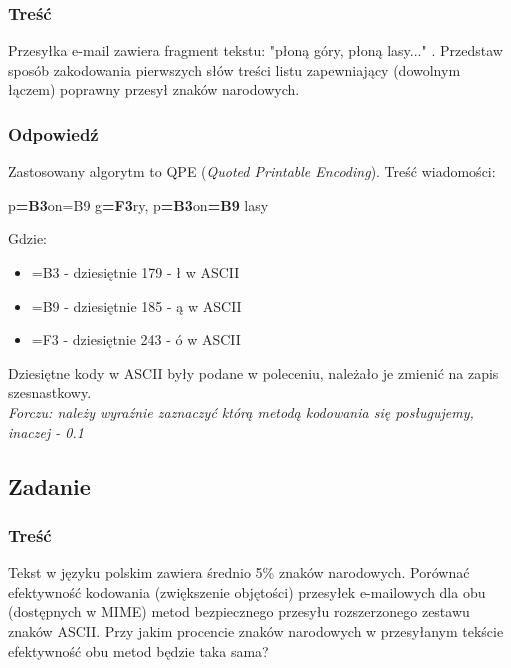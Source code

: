 		\subsubsection{Treść}
			Przesyłka e-mail zawiera fragment tekstu: "płoną góry, płoną lasy..." . Przedstaw sposób zakodowania pierwszych słów treści listu zapewniający (dowolnym łączem) poprawny przesył znaków narodowych.
		\subsubsection{Odpowiedź}
			Zastosowany algorytm to QPE (\emph{Quoted Printable Encoding}). Treść wiadomości:
			\begin{center}
				p\textbf{=B3}on=B9 g\textbf{=F3}ry, p\textbf{=B3}on\textbf{=B9} lasy
			\end{center}
			Gdzie:
			\begin{itemize}
				\item =B3 - dziesiętnie 179 - ł w ASCII
				\item =B9 - dziesiętnie 185 - ą w ASCII
				\item =F3 - dziesiętnie 243 - ó w ASCII
			\end{itemize}
			Dziesiętne kody w ASCII były podane w poleceniu, należało je zmienić na zapis szesnastkowy.\\
			{\small \emph{Forczu: należy wyraźnie zaznaczyć którą metodą kodowania się posługujemy, inaczej - 0.1}}
	\subsection{Zadanie}
		\subsubsection{Treść}
			Tekst w języku polskim zawiera średnio 5\% znaków narodowych. Porównać efektywność kodowania (zwiększenie objętości) przesyłek e-mailowych dla obu (dostępnych w MIME) metod bezpiecznego przesyłu rozszerzonego zestawu znaków ASCII. Przy jakim procencie znaków narodowych w przesyłanym tekście efektywność obu metod będzie taka sama?
